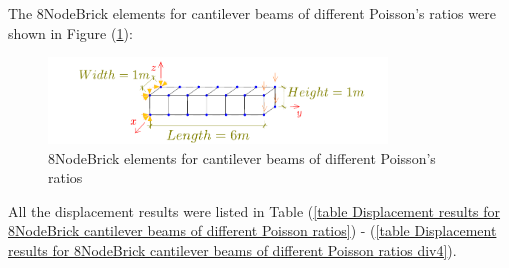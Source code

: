 \documentclass[fleqn,11pt,letter]{article}
\begin{document}
The 8NodeBrick elements for cantilever beams of different Poisson's ratios were shown in Figure (\ref{fig 8NodeBrick elements for cantilever beams of different Poisson's ratios}):
\begin{figure}[H]
  \centering
  \includegraphics[width=9cm]{../Figure_files/8NodeBrick/beam_8brick_6div.pdf}
  \caption{8NodeBrick elements for cantilever beams of different Poisson's ratios}
  \label{fig 8NodeBrick elements for cantilever beams of different Poisson's ratios}
\end{figure}


All the displacement results were listed in Table (\ref{table Displacement results for 8NodeBrick cantilever beams of different Poisson ratios}) - (\ref{table Displacement results for 8NodeBrick cantilever beams of different Poisson ratios div4}). 
\end{document}
